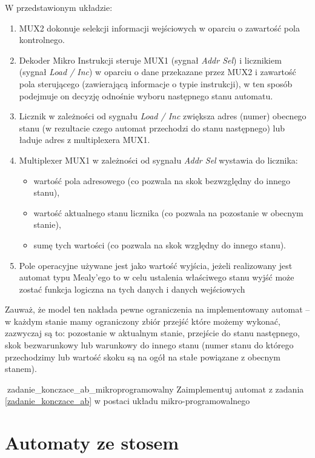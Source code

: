 \documentclass{pdfBooklets}
\begin{document}
\vspace{-6pt}\noindent
W przedstawionym układzie:
\begin{enumerate}
\item MUX2 dokonuje selekcji informacji wejściowych w oparciu o zawartość pola kontrolnego.
\item Dekoder Mikro Instrukcji steruje MUX1 (sygnał \textit{Addr Sel}) i licznikiem (sygnał \textit{Load / Inc}) w oparciu o dane przekazane przez MUX2 i zawartość pola sterującego (zawierającą informacje o typie instrukcji), w ten sposób podejmuje on decyzję odnośnie wyboru następnego stanu automatu.
\item Licznik w zależności od sygnału \textit{Load / Inc} zwiększa adres (numer) obecnego stanu (w rezultacie czego automat przechodzi do stanu następnego) lub ładuje adres z multiplexera MUX1.
\item Multiplexer MUX1 w zależności od sygnału \textit{Addr Sel} wystawia do licznika:
	\begin{itemize}
		\item wartość pola adresowego (co pozwala na skok bezwzględny do innego stanu),
		\item wartość aktualnego stanu licznika (co pozwala na pozostanie w obecnym stanie),
		\item sumę tych wartości (co pozwala na skok względny do innego stanu).
	\end{itemize}
\item Pole operacyjne używane jest jako wartość wyjścia, jeżeli realizowany jest automat typu Mealy'ego to w celu ustalenia właściwego stanu wyjść może zostać funkcja logiczna na tych danych i danych wejściowych
\end{enumerate}

Zauważ, że model ten nakłada pewne ograniczenia na implementowany automat – w każdym stanie mamy ograniczony zbiór przejść które możemy wykonać, zazwyczaj są to: pozostanie w aktualnym stanie, przejście do stanu następnego, skok bezwarunkowy lub warunkowy do innego stanu (numer stanu do którego przechodzimy lub wartość skoku są na ogół na stałe powiązane z obecnym stanem).

\begin{Zadanie}{ {\Symbola 🤔}}{zadanie_konczace_ab_mikroprogramowalny}
Zaimplementuj automat z zadania \ref{zadanie_konczace_ab} w postaci układu mikro-programowalnego
\end{Zadanie}

\section{Automaty ze stosem}
\end{document}

